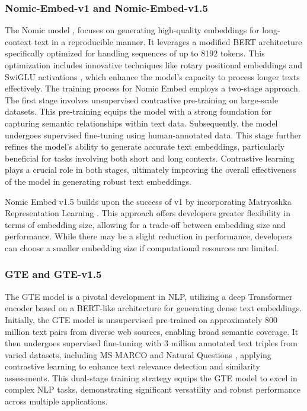\subsubsection{Nomic-Embed-v1 and Nomic-Embed-v1.5} \label{model:nomic-embed}
The Nomic model \cite{nussbaum2024nomic}, focuses on generating high-quality embeddings for long-context text in a reproducible manner.
It leverages a modified \ac{BERT} architecture specifically optimized for handling sequences of up to 8192 tokens.
This optimization includes innovative techniques like rotary positional embeddings \cite{su2023roformer} and SwiGLU activations \cite{shazeer2020glu}, which enhance the model's capacity to process longer texts effectively.
The training process for Nomic Embed employs a two-stage approach.
The first stage involves unsupervised contrastive pre-training on large-scale datasets.
This pre-training equips the model with a strong foundation for capturing semantic relationships within text data.
Subsequently, the model undergoes supervised fine-tuning using human-annotated data.
This stage further refines the model's ability to generate accurate text embeddings, particularly beneficial for tasks involving both short and long contexts.
Contrastive learning plays a crucial role in both stages, ultimately improving the overall effectiveness of the model in generating robust text embeddings.

Nomic Embed v1.5 builds upon the success of v1 by incorporating Matryoshka Representation Learning \cite{kusupati2024matryoshka}.
This approach offers developers greater flexibility in terms of embedding size, allowing for a trade-off between embedding size and performance.
While there may be a slight reduction in performance, developers can choose a smaller embedding size if computational resources are limited.

\subsubsection{\ac{GTE} and \ac{GTE}-v1.5} \label{model:gte}
The \ac{GTE} model is a pivotal development in \ac{NLP}, utilizing a deep Transformer encoder based on a \ac{BERT}-like architecture for generating dense text embeddings.
Initially, the \ac{GTE} model is unsupervised pre-trained on approximately 800 million text pairs from diverse web sources, enabling broad semantic coverage.
It then undergoes supervised fine-tuning with 3 million annotated text triples from varied datasets, including MS MARCO \cite{bajaj2018ms} and Natural Questions \cite{kwiatkowski2019natural}, applying contrastive learning to enhance text relevance detection and similarity assessments.
This dual-stage training strategy equips the \ac{GTE} model to excel in complex \ac{NLP} tasks, demonstrating significant versatility and robust performance across multiple applications.

